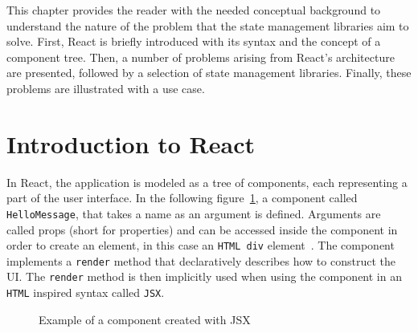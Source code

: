 This chapter provides the reader with the needed conceptual background
to understand the nature of the problem that the state management
libraries aim to solve. First, React is briefly introduced with its
syntax and the concept of a component tree. Then, a number of problems
arising from React's architecture are presented, followed by a selection
of state management libraries. Finally, these problems are illustrated
with a use case.

\hypertarget{introduction-to-react}{%
\section{Introduction to React}\label{introduction-to-react}}

In React, the application is modeled as a tree of components, each
representing a part of the user interface. In the following
figure~\ref{code_hello_message}, a component called \texttt{HelloMessage}, that takes a name as
an argument is defined. Arguments are called props (short for
properties) and can be accessed inside the component in order to create
an element, in this case an \texttt{HTML div} element~\cite{mozilla_div}. The
component implements a \texttt{render} method that declaratively
describes how to construct the UI. The \texttt{render} method is then implicitly
used when using the component in an \texttt{HTML} inspired syntax called
\texttt{JSX}.

\begin{figure}[]
\begin{Shaded}
\begin{Highlighting}[]
\NormalTok{ \{}
  \NormalTok{() \{}
    \VariableTok{\{}\VariableTok{\}}\OperatorTok{;}
\NormalTok{  \}}
\NormalTok{\}}

\NormalTok{(} \OperatorTok{=} \FunctionTok{/\textgreater{}}\NormalTok{)}\OperatorTok{;}
\end{Highlighting}
\end{Shaded}
\caption{Example of a component created with JSX}
\label{code_hello_message}
\end{figure}


